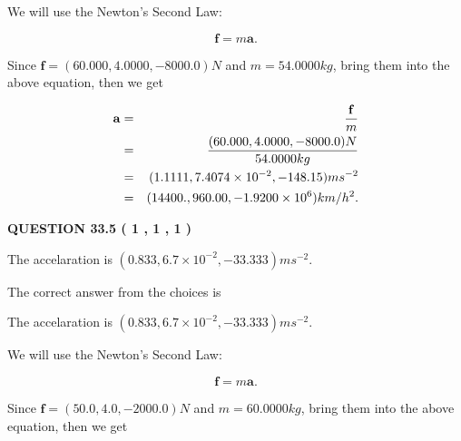 \documentclass[12pt]{article}
\begin{document}
 
 
 
\noindent{}

We will use the Newton's Second Law:
 
\[
\mathbf{f}=m\mathbf{a}.
\]
 
Since $\mathbf{f}=( %
60.000,  %
4.0000,  %
-8000.0 )N$
and $m= %
54.0000kg$, bring them into the above equation, then we get
 
\begin{eqnarray*}
\mathbf{a}&=&\frac{\mathbf{f}}m  \\
&=&\frac{(
60.000 ,
4.0000 ,
-8000.0 )N
}{ %
54.0000 kg}  \\
&=&(
1.1111 ,
7.4074 \times 10^{-2},
-148.15
)ms^{-2} \\
&=&(
14400. ,
960.00 ,
-1.9200 \times 10^{6}
)km/h^2.
\end{eqnarray*}
 
 
 
  
\vspace{0.2in}
  
{\textbf{\Large{QUESTION
33.5 
 (           1 ,           1 ,           1 )
}}}
  
  


 
 
\noindent{}
 
 
The accelaration is $  %
(
0.833,
6.7 \times 10^{-2},
-33.333)
ms^{-2} $.
 
 
 
 
 
 
\noindent{}

The correct answer from the choices is


The accelaration is $  %
(
0.833,
6.7 \times 10^{-2},
-33.333)
ms^{-2} $.
 
 
 
 
 
\noindent{}

We will use the Newton's Second Law:
 
\[
\mathbf{f}=m\mathbf{a}.
\]
 
Since $\mathbf{f}= %
(50.0 , 4.0 , -2000.0) N$
and $m= %
60.0000kg$, bring them into the above equation, then we get
 
\end{document}
